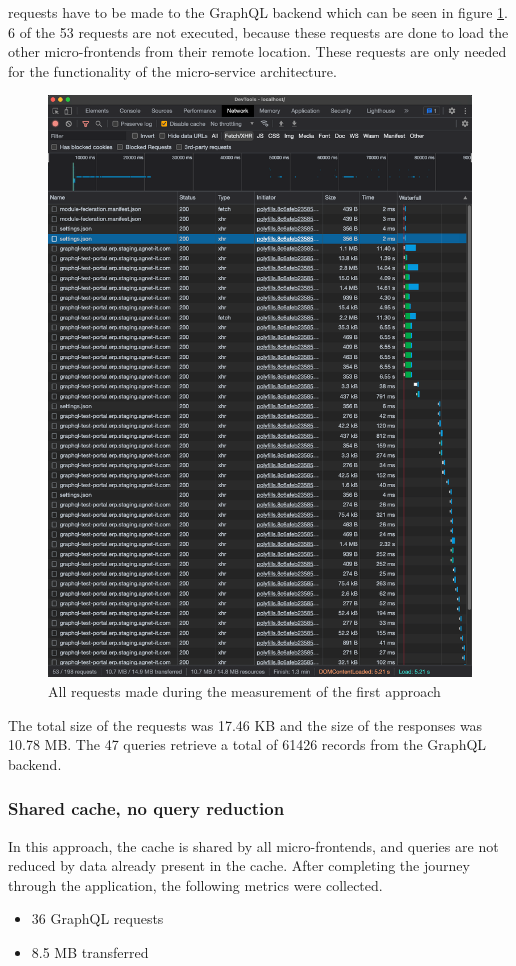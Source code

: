  requests have to be made to the GraphQL backend which can be seen in figure \ref{fig:results:no-shared-cache-no-reduction}. 6 of the 53 requests are not executed, because these requests are done to load the other micro-frontends from their remote location. These requests are only needed for the functionality of the micro-service architecture.

\ifshowImages
\begin{figure}[H]
\centering
\includegraphics[width=0.6\linewidth]{images/results/1-attempt/no-shared-cache-no-reduction.png}
\caption{All requests made during the measurement of the first approach}\label{fig:results:no-shared-cache-no-reduction}
\end{figure}
\fi

\noindent The total size of the requests was 17.46 KB and the size of the responses was 10.78 MB. The 47 queries retrieve a total of 61426 records from the GraphQL backend.

\subsubsection{Shared cache, no query reduction}

In this approach, the cache is shared by all micro-frontends, and queries are not reduced by data already present in the cache. After completing the journey through the application, the following metrics were collected.

\begin{itemize}
  \item 36 GraphQL requests
  \item 8.5 MB transferred
\end{itemize}

